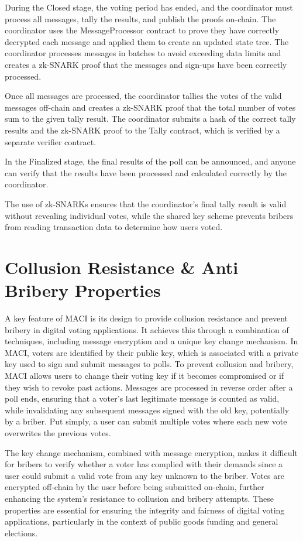 \documentclass[11pt]{article}
\begin{document}
During the Closed stage, the voting period has ended, and the coordinator must process all messages, tally the results, and publish the proofs on-chain. The coordinator uses the MessageProcessor contract to prove they have correctly decrypted each message and applied them to create an updated state tree. The coordinator processes messages in batches to avoid exceeding data limits and creates a zk-SNARK proof that the messages and sign-ups have been correctly processed.

Once all messages are processed, the coordinator tallies the votes of the valid messages off-chain and creates a zk-SNARK proof that the total number of votes sum to the given tally result. The coordinator submits a hash of the correct tally results and the zk-SNARK proof to the Tally contract, which is verified by a separate verifier contract.

In the Finalized stage, the final results of the poll can be announced, and anyone can verify that the results have been processed and calculated correctly by the coordinator.

The use of zk-SNARKs ensures that the coordinator's final tally result is valid without revealing individual votes, while the shared key scheme prevents bribers from reading transaction data to determine how users voted.
\section{Collusion Resistance \& Anti Bribery Properties}
\label{sec:orga98b4ee}

A key feature of MACI is its design to provide collusion resistance and prevent bribery in digital voting applications. It achieves this through a combination of techniques, including message encryption and a unique key change mechanism. In MACI, voters are identified by their public key, which is associated with a private key used to sign and submit messages to polls. To prevent collusion and bribery, MACI allows users to change their voting key if it becomes compromised or if they wish to revoke past actions. Messages are processed in reverse order after a poll ends, ensuring that a voter's last legitimate message is counted as valid, while invalidating any subsequent messages signed with the old key, potentially by a briber. Put simply, a user can submit multiple votes where each new vote overwrites the previous votes.

The key change mechanism, combined with message encryption, makes it difficult for bribers to verify whether a voter has complied with their demands since a user could submit a valid vote from any key unknown to the briber. Votes are encrypted off-chain by the user before being submitted on-chain, further enhancing the system's resistance to collusion and bribery attempts. These properties are essential for ensuring the integrity and fairness of digital voting applications, particularly in the context of public goods funding and general elections.
\end{document}
